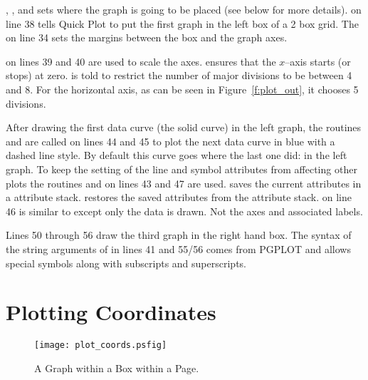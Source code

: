 , , and  sets
where the graph is going to be placed (see below for more details).
 on line 38 tells Quick Plot to put the
first graph in the left box of a 2 box grid. The  on
line 34 sets the margins between the box and the graph axes.

 on lines 39 and 40 are used to scale the
axes.  ensures that the $x$--axis starts (or stops)
at zero.   is told to restrict the number of
major divisions to be between 4 and 8. For the horizontal axis, as can be
seen in Figure~\ref{f:plot_out}, it chooses 5 divisions.

After drawing the first data curve (the solid curve) in the left
graph, the routines  and
 are called on lines 44 and 45 to plot the next
data curve in blue with a dashed line style. By default this curve
goes where the last one did: in the left graph. To keep the setting of
the line and symbol attributes from affecting other plots the routines
 and  on lines 43 and 47 are
used.  saves the current attributes in a attribute
stack.  restores the saved attributes from the
attribute stack.  on line 46 is similar to
 except only the data is drawn. Not the axes and
associated labels.

Lines 50 through 56 draw the third graph in the right hand box.  The
syntax of the string arguments of  in lines 41 and
55/56 comes from PGPLOT and allows special symbols along with subscripts
and superscripts.

\section{Plotting Coordinates}
\label{s:plot_coords}

\begin{figure}
  \centering
  \texttt{[image: plot\_coords.psfig]}
  \caption{A Graph within a Box within a Page.}
  \label{f:plot_coords}
\end{figure}

